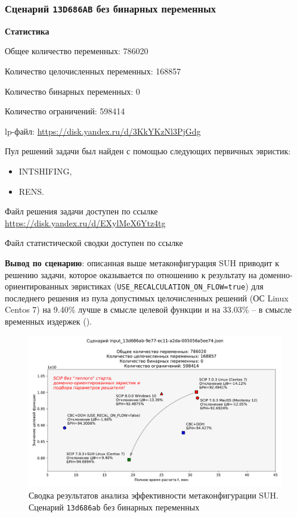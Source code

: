 \documentclass[%
	11pt,
	a4paper,
	utf8,
		]{article}
\begin{document}
\subsubsection{Сценарий \texttt{13D686AB} без бинарных переменных}

\textbf{Статистика}\vspace*{1mm}

Общее количество переменных: 786020

Количество целочисленных переменных: 168857

Количество бинарных переменных: 0

Количество ограничений: 598414

lp-файл: \url{https://disk.yandex.ru/d/3KkYKzNl3PjGdg}

Пул решений задачи был найден с помощью следующих первичных эвристик:
\begin{itemize}
	\item INTSHIFING,
	
	\item RENS.
\end{itemize}

Файл решения задачи доступен по ссылке \url{https://disk.yandex.ru/d/EXylMeX6Ytz4tg}

Файл статистической сводки доступен по ссылке \url{}

\vspace*{3mm}
\textbf{Вывод по сценарию}: описанная выше метаконфигурация SUH приводит к решению задачи, которое оказывается по отношению к результату на доменно-ориентированных эвристиках (\verb|USE_RECALCULATION_ON_FLOW=true|) для последнего решения из пула допустимых целочисленных решений (ОС Linux Centos 7) на 9.40\% лучше в смысле целевой функции и на 33.03\% -- в смысле временных издержек ().

\begin{figure}[!h]
	\centering
	\includegraphics[scale=0.6]{figures/summary_13d686ab.pdf}
	\caption{Сводка результатов анализа эффективности метаконфигурации SUH. \\Сценарий \texttt{13d686ab} без бинарных переменных}\label{fig:summary_13d686ab}
\end{figure}
\end{document}
